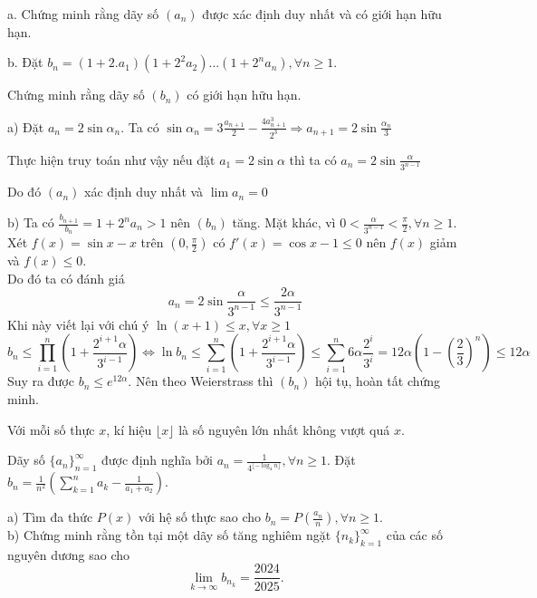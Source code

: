 \documentclass[11pt]{scrartcl}
\begin{document}
\begin{itemize}[label=, leftmargin=0em, itemsep=0.5em]
\begin{bt}
a. Chứng minh rằng dãy số $(a_n)$ được xác định duy nhất và có giới hạn hữu hạn.

b. Đặt $b_n=(1+2.a_1)(1+2^2a_2)...(1+2^na_n), \forall n\ge 1.$

Chứng minh rằng dãy số $(b_n)$ có giới hạn hữu hạn.
    \end{bt}

    \begin{sol}
        a) Đặt $a_n = 2\sin{\alpha_n}$. Ta có $\sin{\alpha_n} = 3\frac{a_{n + 1}}{2} - \frac{4a_{n + 1}^3}{2^3} \Rightarrow a_{n + 1} = 2\sin{\frac{\alpha_n}{3}}$
        

        Thực hiện truy toán như vậy nếu đặt $a_1 = 2\sin{\alpha}$ thì ta có $a_n = 2\sin{\frac{\alpha}{3^{n-1}}}$
        

        Do đó $(a_n)$ xác định duy nhất và $\lim a_n = 0$


        b) Ta có $\frac{b_{n + 1}}{b_n} = 1 + 2^na_n > 1$ nên $(b_n)$ tăng. Mặt khác, vì $0 < \frac{\alpha}{3^{n-1}} < \frac{\pi}{2}, \forall n \geq 1$.\\ Xét $f(x) = \sin{x} - x$ trên $(0, \frac{\pi}{2})$ có $f'(x) = \cos{x} - 1 \leq 0$ nên $f(x)$ giảm và $f(x) \leq 0$.\\ Do đó ta có đánh giá $$a_n =  2\sin{\frac{\alpha}{3^{n-1}}} \leq \frac{2\alpha}{3^{n-1}}$$
        Khi này viết lại với chú ý $\ln(x + 1) \leq x, \forall x \geq 1$
        \[
            b_n \leq  \prod_{i = 1}^n \left(1 + \frac{2^{i + 1}\alpha}{3^{i - 1}}\right)
            \Leftrightarrow \ln b_n \leq \sum _{i = 1}^n  \left(1 + \frac{2^{i + 1}\alpha}{3^{i - 1}}\right) \leq \sum_{i = 1}^n 6\alpha\frac{2^i}{3^i} = 12\alpha\left(1 - \left(\frac{2}{3}\right)^n\right) \leq 12\alpha
        \]
        Suy ra được $b_n \leq e^{12\alpha}$. Nên theo Weierstrass thì $(b_n)$ hội tụ, hoàn tất chứng minh.
    \end{sol}

    \begin{bt}
        Với mỗi số thực $x$, kí hiệu $\lfloor x \rfloor$ là số nguyên lớn nhất không vượt quá $x$.


Dãy số $\{a_n \}_{n=1}^{\infty}$ được định nghĩa bởi $a_n = \frac{1}{4^{\lfloor -\log_4 n \rfloor}}, \forall n \geq 1.$ Đặt $b_n = \frac{1}{n^2} \left( \sum_{k=1}^n a_k - \frac{1}{a_1+a_2} \right).$

a) Tìm đa thức $P(x)$ với hệ số thực sao cho $b_n = P \left( \frac{a_n}{n} \right), \forall n \geq 1$.\\
b) Chứng minh rằng tồn tại một dãy số tăng nghiêm ngặt $\{n_k \}_{k=1}^{\infty}$ của các số nguyên dương sao cho$$\lim_{k \to \infty} b_{n_k} = \frac{2024}{2025}.$$
    \end{bt}


\end{itemize}
\end{document}
